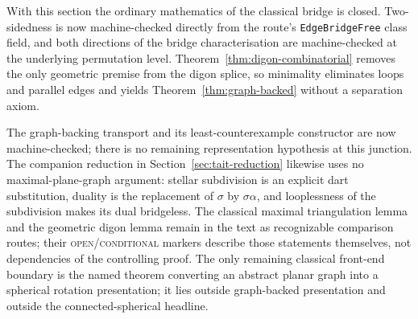 \begin{remark}
\Sprose
With this section the ordinary mathematics of the classical bridge is closed.
Two-sidedness is now machine-checked directly from the route's
\texttt{EdgeBridgeFree} class field, and both directions of the bridge
characterisation are machine-checked at the underlying permutation level.
Theorem~\ref{thm:digon-combinatorial} removes the only
geometric premise from the digon splice, so minimality eliminates loops and
parallel edges and yields Theorem~\ref{thm:graph-backed} without a separation
axiom.

The graph-backing transport and its least-counterexample constructor are now
machine-checked; there is no remaining representation hypothesis at this
junction.  The companion reduction in Section~\ref{sec:tait-reduction} likewise uses no
maximal-plane-graph argument: stellar subdivision is an explicit dart
substitution, duality is the replacement of $\sigma$ by $\sigma\alpha$, and
looplessness of the subdivision makes its dual bridgeless.  The classical
maximal triangulation lemma and the geometric digon lemma remain in the text
as recognizable comparison routes; their \textsc{open}/\textsc{conditional}
markers describe those statements themselves, not dependencies of the
controlling proof.  The only remaining classical front-end boundary is the
named theorem converting an abstract planar graph into a spherical rotation
presentation; it lies outside graph-backed presentation and outside the
connected-spherical headline.
\end{remark}
